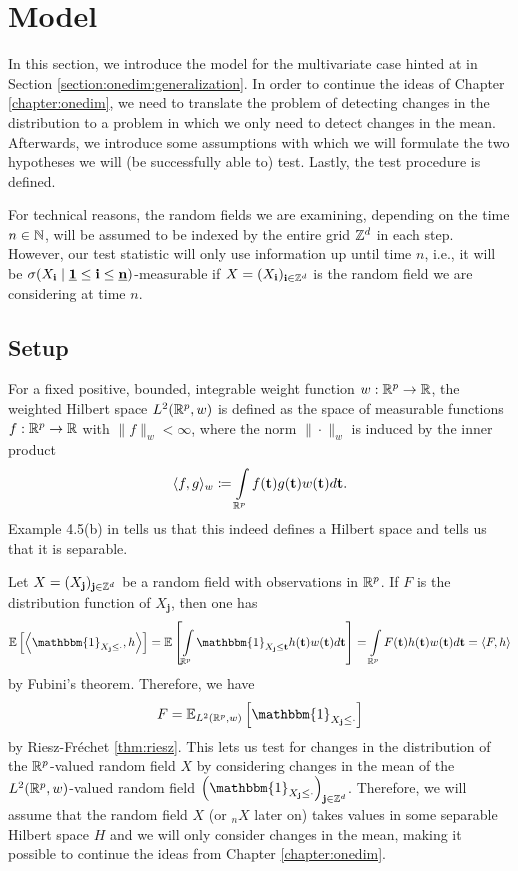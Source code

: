 \section{Model}

In this section, we introduce the model for the multivariate case hinted at in Section \ref{section:onedim:generalization}. In order to continue the ideas of Chapter \ref{chapter:onedim}, we need to translate the problem of detecting changes in the distribution to a problem in which we only need to detect changes in the mean. Afterwards, we introduce some assumptions with which we will formulate the two hypotheses we will (be successfully able to) test. Lastly, the test procedure is defined.

For technical reasons, the random fields we are examining, depending on the time $n \in \mathbb{N}$, will be assumed to be indexed by the entire grid $\mathbb{Z}^d$ in each step. However, our test statistic will only use information up until time $n$, i.e., it will be $\sigma(X_{\mathbf{i}} \mid \usbf[1] \leq \mathbf{i} \leq \usbf[n])$-measurable if $X = (X_\mathbf{i})_{\mathbf{i} \in \mathbb{Z}^d}$ is the random field we are considering at time $n$.

\subsection{Setup} \label{subsection:general setup}

For a fixed positive, bounded, integrable weight function $w: \mathbb{R}^p \to \mathbb{R}$, the weighted Hilbert space $L^2(\mathbb{R}^p, w)$ is defined as the space of measurable functions $f: \mathbb{R}^p \to \mathbb{R}$ with $\|f\|_w < \infty$, where the norm $\|\cdot \|_w$ is induced by the inner product
\begin{equation} \label{defn:<>w}
    \langle f, g \rangle_w \coloneqq \int\limits_{\mathbb{R}^p} f(\mathbf{t})g(\mathbf{t})w(\mathbf{t}) d\mathbf{t}. 
\end{equation}
Example 4.5(b) in \cite{walter1974real} tells us that this indeed defines a Hilbert space and \cite{branishti2017some} tells us that it is separable.

Let $X = (X_\mathbf{j})_{\mathbf{j} \in \mathbb{Z}^d}$ be a random field with observations in $\mathbb{R}^p$. If $F$ is the distribution function of $X_\mathbf{j}$, then one has
\[ \EE{\left\langle \mathbbm{1}_{X_\mathbf{j} \leq \cdot}, h \right\rangle} = \EE{\int\limits_{\RR^p} \mathbbm{1}_{X_\mathbf{j} \leq \mathbf{t}} h(\mathbf{t}) w(\mathbf{t}) d\mathbf{t}} = \int\limits_{\RR^p} F(\mathbf{t}) h(\mathbf{t}) w(\mathbf{t}) d\mathbf{t} = \langle F, h \rangle \]
by Fubini's theorem. Therefore, we have
\[ F = \mathbb{E}_{L^2(\RR^p, w)}\left[ \mathbbm{1}_{X_\mathbf{j} \leq \cdot} \right] \]
by Riesz-Fréchet \ref{thm:riesz}. This lets us test for changes in the distribution of the $\mathbb{R}^p$-valued random field $X$ by considering changes in the mean of the $L^2(\mathbb{R}^p, w)$-valued random field $\left(\mathbbm{1}_{X_\mathbf{j} \leq \cdot}\right)_{\mathbf{j} \in \ZZ^d}$. Therefore, we will assume that the random field $X$ (or ${}_{n}X$ later on) takes values in some separable Hilbert space $H$ and we will only consider changes in the mean, making it possible to continue the ideas from Chapter \ref{chapter:onedim}.

